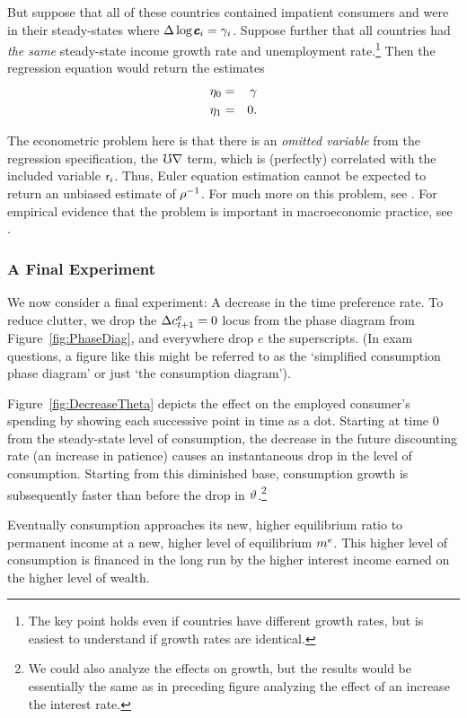 \documentclass{handout}
\begin{document}
But suppose that all of these countries contained impatient consumers
and were in their steady-states where $\Delta \log \pmb{c}_{i} = \gamma_{i}$.
Suppose further
that all countries had {\it the same} steady-state income growth rate and
unemployment rate.\footnote{The key point holds even if countries have different
growth rates, but is easiest to understand if growth rates are identical.}
Then the regression equation would return the estimates
\begin{eqnarray}
        \eta_{0} & = & \gamma  \\
        \eta_{1} & = & 0.
\end{eqnarray}

The econometric problem here is that there is an {\it omitted
variable} from the regression specification, the $\mho \nabla$ term, which is (perfectly) correlated with the included
variable $\mathsf{r}_{i}$.  Thus, Euler equation estimation cannot be expected to
return an unbiased estimate of $\rho^{-1}$.  For much more on this
problem, see \cite{carroll:death}.  For empirical evidence
that the problem is important in macroeconomic practice, see \cite{ParkerPrestonPrecaution}.

\subsubsection{A Final Experiment}
We now consider a final experiment: A decrease in the time preference
rate.  To reduce clutter, we drop the $\Delta c^{e}_{t+1}=0$ locus from the 
phase diagram from Figure~\ref{fig:PhaseDiag}, and everywhere drop $e$ the superscripts.  
(In exam questions, a figure like this might be referred to as the `simplified consumption phase diagram' or just
`the consumption diagram').

Figure~\ref{fig:DecreaseTheta} depicts the effect on the 
employed consumer's spending by
showing each successive point in time as a dot.  
Starting at time 0 from the steady-state level of consumption, the
decrease in the future discounting rate (an increase in patience) causes
an instantaneous drop in the level of consumption.  Starting from this diminished 
base, consumption growth is subsequently faster than before the drop in $\vartheta$.\footnote{We could also analyze the effects on growth, but the
  results would be essentially the same as in preceding figure
  analyzing the effect of an increase the interest rate.}

Eventually consumption approaches its new, higher equilibrium ratio
to permanent income at a new, higher level of equilibrium $m^{e}$.  This
higher level of consumption is financed in the long run by the higher
interest income earned on the higher level of wealth.
\end{document}
